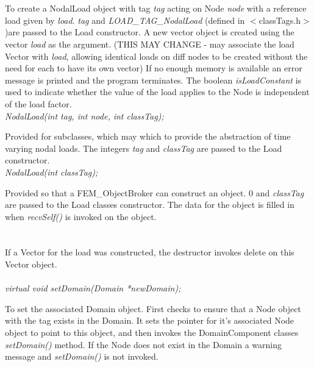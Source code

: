   \\
  \\
To create a NodalLoad object with tag {\em tag} acting on Node {\em node} with a
reference load given by {\em load}. {\em tag} and {\em LOAD\_TAG\_NodalLoad} (defined in
$<$classTags.h$>$)are passed to the Load constructor.  A new vector object is created using
the vector {\em load} as the argument. (THIS MAY CHANGE - may associate
the load Vector with {\em load}, allowing identical loads on diff
nodes to be created without the need for each to have its own
vector) If no enough memory is available an error message is printed
and the program terminates. The boolean {\em isLoadConstant} is used
to indicate whether the value of the load applies to the Node is
independent of the load factor. \\ 

{\em NodalLoad(int tag, int node, int classTag);}  

Provided for subclasses, which may which to provide the abstraction of
time varying nodal loads. The integers {\em tag} and {\em classTag}
are passed to the Load constructor. \\

{\em NodalLoad(int classTag);}  

Provided so that a FEM\_ObjectBroker can construct an object. $0$ and
{\em classTag} are passed to the Load classes constructor. The data
for the object is filled in when {\em recvSelf()} is invoked on the
object.\\

  \\
 \\ 
If a Vector for the load was constructed, the destructor invokes
delete on this Vector object. \\


  \\
{\em virtual void setDomain(Domain *newDomain);} 

To set the associated Domain object. First checks to ensure that a
Node object with the tag exists in the Domain. It sets the pointer for
it's associated Node object to point to this object, and then 
invokes the DomainComponent classes {\em setDomain()} method. If the
Node does not exist in the Domain a warning message and {\em
setDomain()} is not invoked. \\


